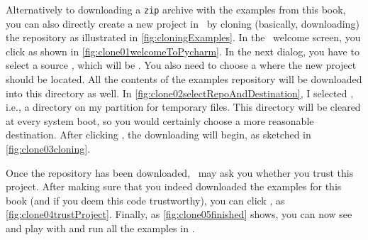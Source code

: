 %
\begin{sloppypar}%
Alternatively to downloading a \texttt{zip} archive with the examples from this book, you can also directly create a new project in \pycharm\ by cloning (basically, downloading) the repository as illustrated in \cref{fig:cloningExamples}.
In the \pycharm\ welcome screen, you click  as shown in \cref{fig:clone01welcomeToPycharm}.
In the next dialog, you have to select a source , which will be \programmingWithPythonCodeRepo.
You also need to choose a  where the new project should be located.
All the contents of the examples repository will be downloaded into this directory as well.
In \cref{fig:clone02selectRepoAndDestination}, I selected , i.e., a directory on my partition for temporary files.
This directory will be cleared at every system boot, so you would certainly choose a more reasonable destination.
After clicking , the downloading will begin, as sketched in \cref{fig:clone03cloning}.%
\end{sloppypar}%
%
Once the repository has been downloaded, \pycharm\ may ask you whether you trust this project.
After making sure that you indeed downloaded the examples for this book (and if you deem this code trustworthy), you can click , as \cref{fig:clone04trustProject}.
Finally, as \cref{fig:clone05finished} shows, you can now see and play with and run all the examples in \pycharm.%
%
\endhsection%
%
